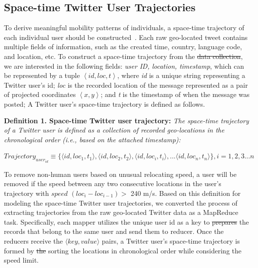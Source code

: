 \documentclass[ijgi,article,accept,moreauthors,pdftex,10pt,a4paper]{mdpi}
\theoremstyle{mdpi}
\newcounter{ex}
\newcounter{re}
\theoremstyle{mdpidefinition}
\providecommand{\DIFadd}[1]{{\protect\color{blue}\uwave{#1}}} %
\providecommand{\DIFdel}[1]{{\protect\color{red}\sout{#1}}}                      %
\providecommand{\DIFaddbegin}{} %
\providecommand{\DIFaddend}{} %
\providecommand{\DIFdelbegin}{} %
\providecommand{\DIFdelend}{} %
\begin{document}
\subsection{Space-time Twitter User Trajectories}
To derive meaningful mobility patterns of individuals, a space-time trajectory of each individual user should be constructed~\cite{hagerstrand1985time}.
Each raw geo-located tweet contains multiple fields of information, such as the created time, country, language code, and location, etc.
To construct a space-time trajectory from the \DIFdelbegin \DIFdel{data collection}\DIFdelend \DIFaddbegin \DIFadd{dataset}\DIFaddend , we are interested in the following fields: \textit{user ID, location, timestamp}, which can be represented by a tuple $\left\langle id, loc, t\right\rangle$, where \textit{id} is a unique string representing a Twitter user's id; \textit{loc} is the recorded location of the message represented as a pair of projected coordinates $\left\langle x, y\right\rangle$;
and \textit{t} is the timestamp of when the message was posted; A Twitter user's space-time trajectory is defined as follows.
\newline

\noindent\textbf{Definition 1. Space-time Twitter user trajectory:} \emph{The space-time trajectory of a Twitter user is defined as a collection of recorded geo-locations in the chronological order (i.e., based on the attached timestamp):} 
\newline

$Trajectory_{user_{id}} \equiv \lbrace \langle id, loc_{1}, t_{1}\rangle, \langle id, loc_{2}, t_{2}\rangle, \langle id, loc_{i}, t_{i}\rangle, ... \langle id, loc_{n}, t_{n}\rangle \rbrace, i = 1, 2, 3...n$
\newline

To remove non-human users based on unusual relocating speed, a user will be removed if the speed between any two consecutive locations in the user's trajectory with $speed$ $(loc_{i} - loc_{i-1}) > $ 240 m/s.
Based on this definition for modeling the space-time Twitter user trajectories, we converted the process of extracting trajectories from the raw geo-located Twitter data as a MapReduce task. Specifically, each mapper utilizes the unique user id as a key to \DIFdelbegin \DIFdel{prepares }\DIFdelend \DIFaddbegin \DIFadd{prepare }\DIFaddend the records that belong to the same user and send them to \DIFaddbegin \DIFadd{a }\DIFaddend reducer. Once the reducers receive the $\langle key, value\rangle$ pairs, a Twitter user's space-time trajectory is formed by \DIFdelbegin \DIFdel{the }\DIFdelend sorting the locations in chronological order while considering the speed limit.
\newline
\end{document}
